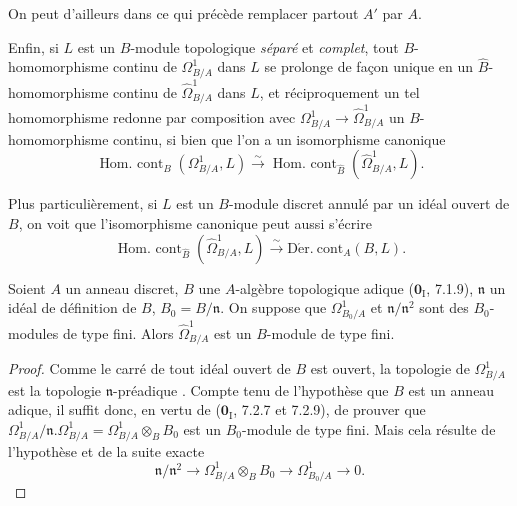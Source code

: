 \begin{env}[20.7.14]
On peut d'ailleurs dans ce qui précède remplacer partout $A'$ par $A$.

Enfin, si $L$ est un $B$-module topologique \emph{séparé} et \emph{complet}, tout
$B$-homomorphisme continu de $\Omega^1_{B/A}$ dans $L$ se prolonge de façon
unique en un $\widehat B$-homomorphisme continu de
$\widehat{\Omega}^1_{B/A}$ dans $L$, et réciproquement un tel homomorphisme
redonne par composition avec $\Omega^1_{B/A}\to\widehat{\Omega}^1_{B/A}$ un
$B$-homomorphisme continu, si bien que l'on a un isomorphisme canonique
\[
  \operatorname{Hom.\ cont}_B(\Omega^1_{B/A},L)\xrightarrow{\sim}
  \operatorname{Hom.\ cont}_{\widehat B}(\widehat{\Omega}^1_{B/A},L).
\]

Plus particulièrement, si $L$ est un $B$-module discret annulé par un idéal
ouvert de $B$, on voit que l'isomorphisme canonique
 peut aussi s'écrire
\begin{equation}
\tag{20.7.14.4}
\label{0.20.7.14.4-fr}
  \operatorname{Hom.\ cont}_{\widehat B}(\widehat{\Omega}^1_{B/A},L)
  \xrightarrow{\sim}\operatorname{D\acute{e}r.\ cont}_A(B,L).
\end{equation}
\end{env}

\begin{proposition}[20.7.15]
\label{0.20.7.15-fr}
Soient $A$ un anneau discret, $B$ une $A$-algèbre topologique adique
\textup{($\mathbf{0}_{\mathrm I}$, 7.1.9)}, $\mathfrak{n}$ un idéal de définition de
$B$, $B_0=B/\mathfrak{n}$. On suppose que $\Omega^1_{B_0/A}$ et
$\mathfrak{n}/\mathfrak{n}^2$ sont des $B_0$-modules de type fini. Alors
$\widehat{\Omega}^1_{B/A}$ est un $B$-module de type fini.
\end{proposition}

\begin{proof}
Comme le carré de tout idéal ouvert de $B$ est ouvert, la topologie de
$\Omega^1_{B/A}$ est la topologie $\mathfrak{n}$-préadique
. Compte tenu de l'hypothèse que $B$ est un anneau adique,
il suffit donc, en vertu de ($\mathbf{0}_{\mathrm I}$, 7.2.7 et 7.2.9), de
prouver
que $\Omega^1_{B/A}/\mathfrak{n}.\Omega^1_{B/A}=
\Omega^1_{B/A}\otimes_B B_0$ est un $B_0$-module de type fini. Mais cela
résulte de l'hypothèse et de la suite exacte 
\[
  \mathfrak{n}/\mathfrak{n}^2\to
  \Omega^1_{B/A}\otimes_B B_0\to\Omega^1_{B_0/A}\to0.
\]
\end{proof}

